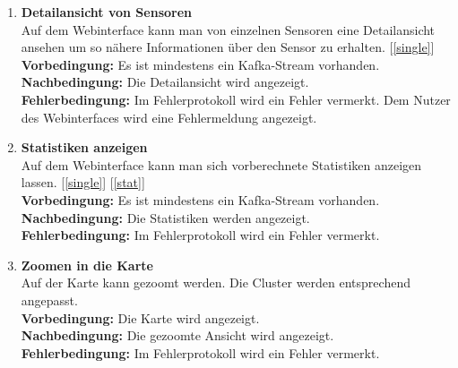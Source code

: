 \begin{enumerate}[label=\textbf{PF\arabic{enumi}0}]
	\item \textbf{Detailansicht von Sensoren}\\
		Auf dem Webinterface kann man von einzelnen Sensoren eine Detailansicht ansehen um so nähere Informationen über den Sensor zu erhalten. [\ref{single}]\\
		\textbf{Vorbedingung:} Es ist mindestens ein Kafka-Stream vorhanden.\\
		\textbf{Nachbedingung:} Die Detailansicht wird angezeigt.\\
		\textbf{Fehlerbedingung:} Im Fehlerprotokoll wird ein Fehler vermerkt. Dem Nutzer des Webinterfaces wird eine Fehlermeldung angezeigt.
		
	\item \textbf{Statistiken anzeigen}\\
		Auf dem Webinterface kann man sich vorberechnete Statistiken anzeigen lassen. [\ref{single}] [\ref{stat}]\\
		\textbf{Vorbedingung:} Es ist mindestens ein Kafka-Stream vorhanden.\\
		\textbf{Nachbedingung:} Die Statistiken werden angezeigt.\\
		\textbf{Fehlerbedingung:} Im Fehlerprotokoll wird ein Fehler vermerkt.
				
	\item \textbf{Zoomen in die Karte}\\
		Auf der Karte kann gezoomt werden. Die Cluster werden entsprechend angepasst.\\
		\textbf{Vorbedingung:} Die Karte wird angezeigt.\\
		\textbf{Nachbedingung:} Die gezoomte Ansicht wird angezeigt.\\
		\textbf{Fehlerbedingung:} Im Fehlerprotokoll wird ein Fehler vermerkt.
		
\end{enumerate}

